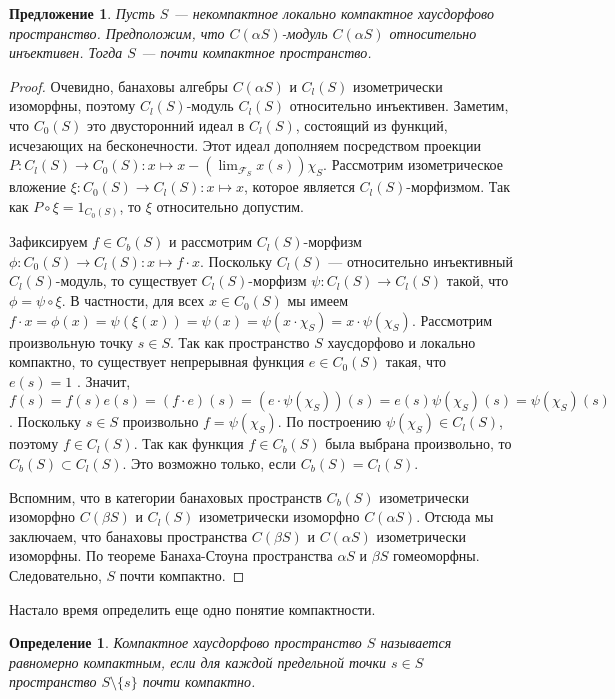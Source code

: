 \documentclass[12pt]{article}
\newtheorem{proposition}[theorem]{Предложение}
\newtheorem{definition}[theorem]{Определение}
\begin{document}
\begin{proposition}\label{RelInjCaSModCaSImplSAlmComp} Пусть $S$ --- некомпактное локально компактное хаусдорфово пространство. Предположим, что $C(\alpha S)$-модуль $C(\alpha S)$ относительно инъективен. Тогда $S$ --- почти компактное пространство.
\end{proposition}
\begin{proof} Очевидно, банаховы алгебры $C(\alpha S)$ и $C_l(S)$ изометрически изоморфны, поэтому $C_l(S)$-модуль $C_l(S)$ относительно инъективен. Заметим, что $C_0(S)$ это двусторонний идеал в $C_l(S)$, состоящий из функций, исчезающих на бесконечности. Этот идеал дополняем посредством проекции $P:C_l(S)\to C_0(S):x\mapsto x-(\lim_{\mathcal{F}_S}x(s))\chi_{S}$. Рассмотрим изометрическое вложение $\xi:C_0(S)\to C_l(S):x\mapsto x$, которое является $C_l(S)$-морфизмом. Так как $P\circ\xi=1_{C_0(S)}$, то $\xi$ относительно допустим.

    Зафиксируем $f \in C_b(S)$ и рассмотрим $C_l(S)$-морфизм $\phi:C_0(S)\to C_l(S):x\mapsto f \cdot x$. Поскольку $C_l(S)$  --- относительно инъективный $C_l(S)$-модуль, то существует $C_l(S)$-морфизм $\psi:C_l(S)\to C_l(S)$ такой, что $\phi=\psi\circ\xi$. В частности, для всех $x\in C_0(S)$ мы имеем $f\cdot x=\phi(x)=\psi(\xi(x))=\psi(x)=\psi(x\cdot \chi_{S})=x\cdot \psi(\chi_{S})$. Рассмотрим произвольную точку $s\in S$. Так как пространство $S$ хаусдорфово и локально компактно, то существует непрерывная функция $e\in C_0(S)$ такая, что $e(s)=1$  \cite[следствие 3.3.3]{EngkingGenTop}. Значит, $f(s)=f(s)e(s)=(f\cdot e)(s)=(e\cdot\psi(\chi_{S}))(s)=e(s)\psi(\chi_{S})(s)=\psi(\chi_{S})(s)$. Поскольку $s\in S$ произвольно $f=\psi(\chi_{S})$. По построению $\psi(\chi_S)\in C_l(S)$, поэтому $f\in C_l(S)$. Так как функция $f\in C_b(S)$ была выбрана произвольно, то $C_b(S)\subset C_l(S)$. Это возможно только, если $C_b(S)=C_l(S)$.

    Вспомним, что в категории банаховых пространств $C_b(S)$ изометрически изоморфно $C(\beta S)$ и $C_l(S)$ изометрически изоморфно $C(\alpha S)$. Отсюда мы заключаем, что банаховы пространства $C(\beta S)$ и $C(\alpha S)$ изометрически изоморфны. По теореме Банаха-Стоуна \cite[теорема 83]{StoneBanStAppBoolRngToTop} пространства $\alpha S$ и $\beta S$ гомеоморфны. Следовательно, $S$ почти компактно.
\end{proof}

Настало время определить еще одно понятие компактности.

\begin{definition} Компактное хаусдорфово пространство $S$ называется равномерно компактным, если для каждой предельной точки $s\in S$ пространство $S\setminus\{s\}$ почти компактно.
\end{definition}
\end{document}
